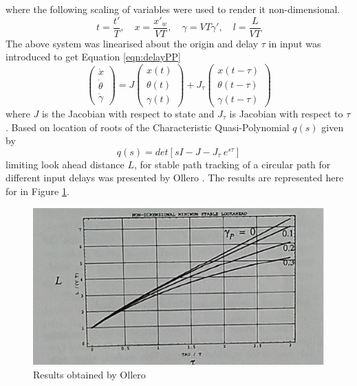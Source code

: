 where the following scaling of variables were used to render it non-dimensional. 
\begin{equation*}
t=\frac{t'}{T}, \quad x=\frac{x'_w}{VT}, \quad \gamma=VT\gamma',\quad l=\frac{L}{VT}
\end{equation*}
The above system was linearised about the origin and  delay $\tau$ in  input was introduced  to get Equation \ref{eqn:delayPP}
\begin{equation}
\label{eqn:delayPP}
\begin{pmatrix}
\dot{x}\\\dot{\theta}\\\dot{\gamma}
\end{pmatrix}
=J
\begin{pmatrix}
x(t)\\\theta(t)\\\gamma(t)
\end{pmatrix}+
J_\tau 
\begin{pmatrix}
x(t-\tau)\\\theta(t-\tau)\\\gamma(t-\tau)
\end{pmatrix}
\end{equation}
where $J$ is the Jacobian with respect to state and $J_\tau$ is Jacobian with respect to $\tau$. 
Based on location of roots of the Characteristic Quasi-Polynomial $q(s)$ given by  \[q(s)=det[sI-J-J_\tau~ e^{s\tau} ] \]  limiting  look ahead distance $L$, for stable path tracking of a  circular path for different input delays was presented by Ollero \cite{ollero1995stability} . The results are represented here for  in Figure \ref{fig:resultsPP}.
  \begin{figure}[h]
  	\centering
	\includegraphics[width=\linewidth]{Chapter7/fig/resultsPP}
	\caption{Results obtained by Ollero \cite{ollero1995stability} }
	\label{fig:resultsPP}
\end{figure}